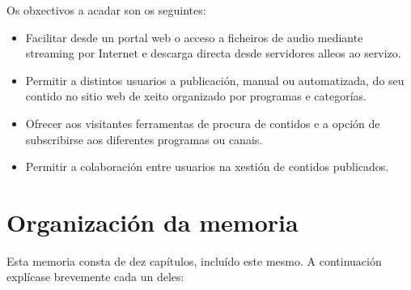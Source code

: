 Os obxectivos a acadar son os seguintes:

\begin{itemize}
\item Facilitar desde un portal web o acceso a ficheiros de audio mediante streaming por Internet e descarga directa desde servidores alleos ao servizo.
\item Permitir a distintos usuarios a publicación, manual ou automatizada, do seu contido no sitio web de xeito organizado por programas e categorías.
\item Ofrecer aos visitantes ferramentas de procura de contidos e a opción de subscribirse aos diferentes programas ou canais.
\item Permitir a colaboración entre usuarios na xestión de contidos publicados.
\end{itemize}



\section{Organización da memoria}

Esta memoria consta de dez capítulos, incluído este mesmo. A continuación explícase brevemente cada un deles:

